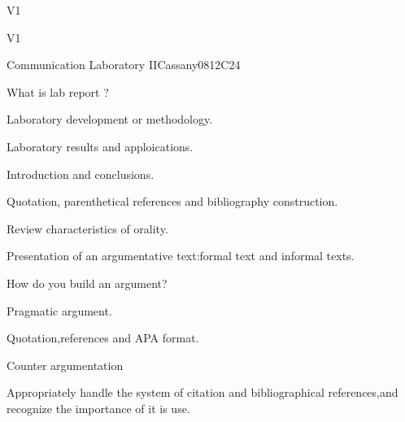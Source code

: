 \begin{syllabus}
\begin{outcomes}{V1}
    \item {}
    \item {}
\end{outcomes}

\begin{competences}{V1}
    \item {}
\end{competences}

\begin{unit}{Communication Laboratory II}{}{Cassany08}{12}{C24}
   \begin{topics}
      \item What is lab report ?
      \item Laboratory development or methodology.
      \item Laboratory results and apploications.
      \item Introduction and conclusions.
      \item Quotation, parenthetical references and bibliography construction.
      \item Review characteristics of orality.
      \item Presentation of an argumentative text:formal text and informal texts.
      \item How do you build an argument?
      \item Pragmatic argument.
      \item Quotation,references and APA format.
      \item Counter argumentation 
      
   \end{topics}
   \begin{learningoutcomes}
      \item Appropriately handle the system of citation and bibliographical references,and recognize the importance of it is use.
   \end{learningoutcomes}
\end{unit}

\begin{coursebibliography}
\end{coursebibliography}

\end{syllabus}
